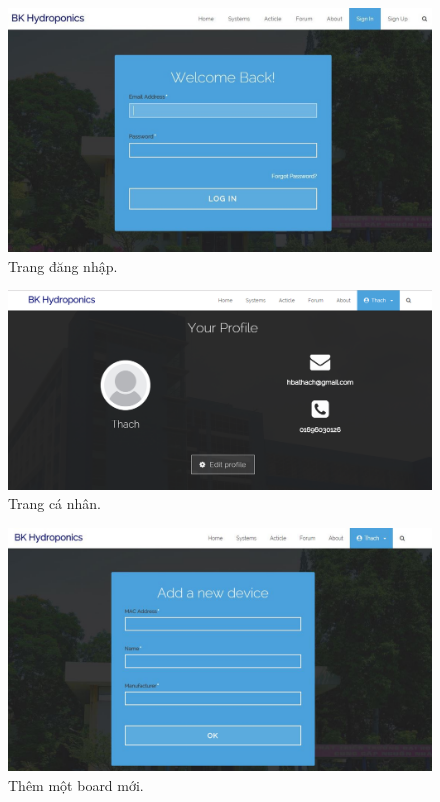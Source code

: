 \documentclass[a4paper,12pt,oneside]{article}
\begin{document}
\begin{center}
\begin{figure}[H]
\centering
\includegraphics[scale=.5]{hinh/web_login.jpg}
\caption{Trang đăng nhập.}
\end{figure}

\begin{figure}[H]
\centering
\includegraphics[scale=.45]{hinh/web_profile.png}
\caption{Trang cá nhân.}
\end{figure}

\begin{figure}[H]
\centering
\includegraphics[scale=.5]{hinh/web_add_device.jpg}
\caption{Thêm một board mới.}
\end{figure}


\end{center}
\end{document}
